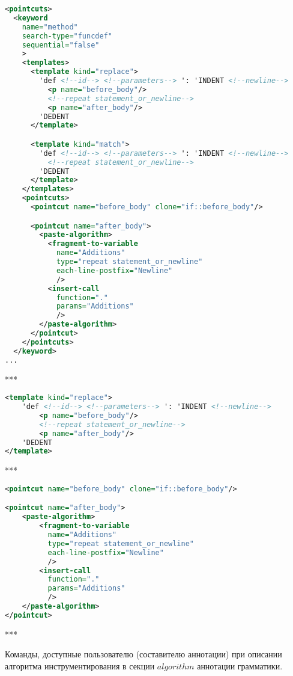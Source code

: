 \begin{lstlisting}[frame=single, language=XML, label={annotation-pointcuts-example}, caption={Пример}]
<pointcuts>
  <keyword
    name="method"
    search-type="funcdef"
    sequential="false"
    >
    <templates>
      <template kind="replace">
        'def <!--id--> <!--parameters--> ': 'INDENT <!--newline-->
          <p name="before_body"/>
          <!--repeat statement_or_newline-->
          <p name="after_body"/>
        'DEDENT
      </template>

      <template kind="match">
        'def <!--id--> <!--parameters--> ': 'INDENT <!--newline-->
          <!--repeat statement_or_newline-->
        'DEDENT
      </template>
    </templates>
    <pointcuts>
      <pointcut name="before_body" clone="if::before_body"/>

      <pointcut name="after_body">
        <paste-algorithm>
          <fragment-to-variable
            name="Additions"
            type="repeat statement_or_newline"
            each-line-postfix="Newline"
            />
          <insert-call
            function="."
            params="Additions"
            />
        </paste-algorithm>
      </pointcut>
    </pointcuts>
  </keyword>
...
\end{lstlisting}

***

\begin{lstlisting}[frame=single, language=XML, label={annotation-template-example}, caption={Пример}]
<template kind="replace">
    'def <!--id--> <!--parameters--> ': 'INDENT <!--newline-->
        <p name="before_body"/>
        <!--repeat statement_or_newline-->
        <p name="after_body"/>
    'DEDENT
</template>
\end{lstlisting}

***

\begin{lstlisting}[frame=single, language=XML, label={annotation-algo-example}, caption={Пример}]
<pointcut name="before_body" clone="if::before_body"/>

<pointcut name="after_body">
    <paste-algorithm>
        <fragment-to-variable
          name="Additions"
          type="repeat statement_or_newline"
          each-line-postfix="Newline"
          />
        <insert-call
          function="."
          params="Additions"
          />
    </paste-algorithm>
</pointcut>
\end{lstlisting}

***

Команды, доступные пользователю (составителю аннотации) при описании алгоритма инструментирования в секции $algorithm$ аннотации грамматики.

